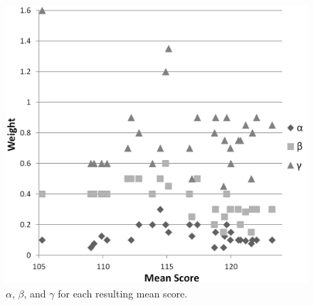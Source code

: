 \documentclass[letterpaper]{article}
\begin{document}

\begin{figure}[t]
\begin{center}
\includegraphics[width=1\linewidth]{images/1-2-3_weights.png}
\end{center}
\caption{$\alpha$, $\beta$, and $\gamma$ for each resulting mean score.}
\label{fig:123weights}
\end{figure}
\end{document}
